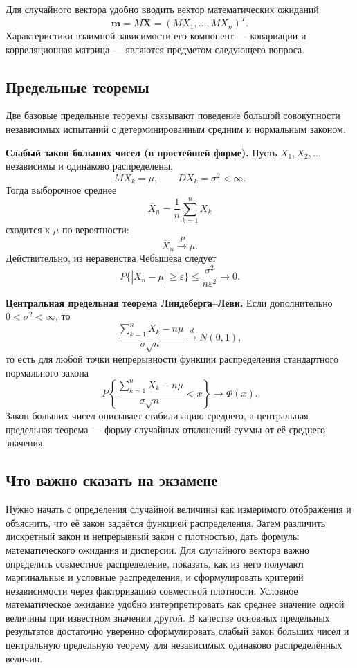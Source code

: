 Для случайного вектора удобно вводить вектор математических ожиданий
\[
    \mathbf m=M\mathbf X=(MX_1,\ldots,MX_n)^T.
\]
Характеристики взаимной зависимости его компонент --- ковариации и
корреляционная матрица --- являются предметом следующего вопроса.

\subsection{Предельные теоремы}

Две базовые предельные теоремы связывают поведение большой совокупности
независимых испытаний с детерминированным средним и нормальным законом.

\textbf{Слабый закон больших чисел (в простейшей форме).}
Пусть $X_1,X_2,\ldots$ независимы и одинаково распределены,
\[
    MX_k=\mu,\qquad DX_k=\sigma^2<\infty.
\]
Тогда выборочное среднее
\[
    \overline X_n=\frac1n\sum_{k=1}^nX_k
\]
сходится к $\mu$ по вероятности:
\[
    \overline X_n\xrightarrow{P}\mu.
\]
Действительно, из неравенства Чебышёва следует
\[
    P\{|\overline X_n-\mu|\geq\varepsilon\}
    \leq \frac{\sigma^2}{n\varepsilon^2}
    \longrightarrow0.
\]

\textbf{Центральная предельная теорема Линдеберга--Леви.}
Если дополнительно $0<\sigma^2<\infty$, то
\[
    \frac{\sum_{k=1}^nX_k-n\mu}{\sigma\sqrt n}
    \xrightarrow{d}N(0,1),
\]
то есть для любой точки непрерывности функции распределения стандартного
нормального закона
\[
    P\left\{
      \frac{\sum_{k=1}^nX_k-n\mu}{\sigma\sqrt n}<x
    \right\}
    \longrightarrow \Phi(x).
\]
Закон больших чисел описывает стабилизацию среднего, а центральная предельная
теорема --- форму случайных отклонений суммы от её среднего значения.

\subsection{Что важно сказать на экзамене}

Нужно начать с определения случайной величины как измеримого отображения и
объяснить, что её закон задаётся функцией распределения. Затем различить
дискретный закон и непрерывный закон с плотностью, дать формулы математического
ожидания и дисперсии. Для случайного вектора важно определить совместное
распределение, показать, как из него получают маргинальные и условные
распределения, и сформулировать критерий независимости через факторизацию
совместной плотности. Условное математическое ожидание удобно интерпретировать
как среднее значение одной величины при известном значении другой. В качестве
основных предельных результатов достаточно уверенно сформулировать слабый закон
больших чисел и центральную предельную теорему для независимых одинаково
распределённых величин.

\newpage
